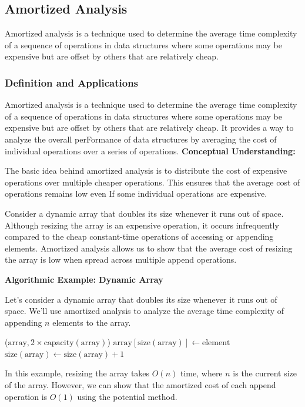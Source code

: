 \documentclass[12pt]{book} %
\begin{document}
\subsection{Amortized Analysis}

Amortized analysis is a technique used to determine the average time complexity of a sequence of operations in data structures where some operations may be expensive but are offset by others that are relatively cheap.

\subsubsection{Definition and Applications}

Amortized analysis is a technique used to determine the average time complexity of a sequence of operations in data structures where some operations may be expensive but are offset by others that are relatively cheap. It provides a way to analyze the overall perFormance of data structures by averaging the cost of individual operations over a series of operations.
\FloatBarrier
\textbf{Conceptual Understanding:}
\FloatBarrier

The basic idea behind amortized analysis is to distribute the cost of expensive operations over multiple cheaper operations. This ensures that the average cost of operations remains low even If some individual operations are expensive. 

Consider a dynamic array that doubles its size whenever it runs out of space. Although resizing the array is an expensive operation, it occurs infrequently compared to the cheap constant-time operations of accessing or appending elements. Amortized analysis allows us to show that the average cost of resizing the array is low when spread across multiple append operations.

\FloatBarrier
\textbf{Algorithmic Example: Dynamic Array}
\FloatBarrier

Let's consider a dynamic array that doubles its size whenever it runs out of space. We'll use amortized analysis to analyze the average time complexity of appending \(n\) elements to the array.
\FloatBarrier
\begin{algorithm}
\caption{Append Operation on Dynamic Array}
\begin{algorithmic}[1]
        \State {}($\text{array}, 2 \times \text{capacity}(\text{array})$)
    \EndIf
    \State $\text{array}[\text{size}(\text{array})] \gets \text{element}$
    \State $\text{size}(\text{array}) \gets \text{size}(\text{array}) + 1$
\EndFunction
\end{algorithmic}
\end{algorithm}
\FloatBarrier
In this example, resizing the array takes \(O(n)\) time, where \(n\) is the current size of the array. However, we can show that the amortized cost of each append operation is \(O(1)\) using the potential method.
\end{document}

